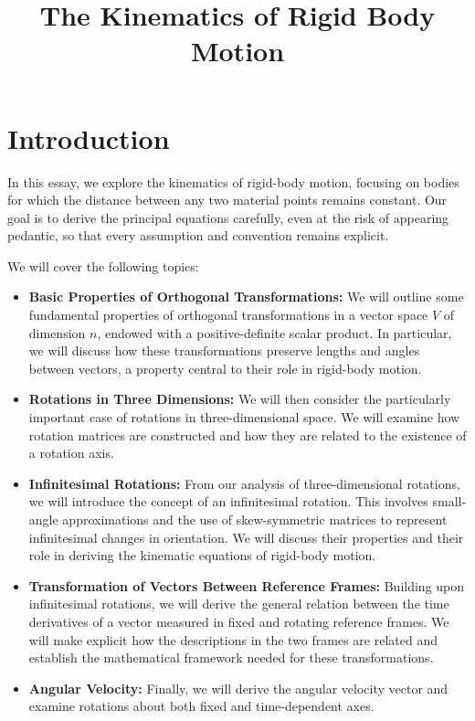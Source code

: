 \documentclass[12pt]{article}
\title{The Kinematics of Rigid Body Motion}
\author{}
\date{}
\begin{document}
\maketitle


\section{Introduction}

In this essay, we explore the kinematics of rigid-body motion, focusing on bodies for which
the distance between any two material points remains constant. Our goal is to derive the
principal equations carefully, even at the risk of appearing pedantic, so that every
assumption and convention remains explicit.\par

We will cover the following topics:

\begin{itemize}
\item \textbf{Basic Properties of Orthogonal Transformations:} We will outline some
fundamental properties of orthogonal transformations in a vector space $V$ of
dimension $n$, endowed with a positive-definite scalar product. In particular, we
will discuss how these transformations preserve lengths and angles between vectors,
a property central to their role in rigid-body motion.

\item \textbf{Rotations in Three Dimensions:} We will then consider the particularly
important case of rotations in three-dimensional space. We will examine how rotation
matrices are constructed and how they are related to the existence of a rotation
axis.

\item \textbf{Infinitesimal Rotations:} From our analysis of three-dimensional rotations,
we will introduce the concept of an infinitesimal rotation. This involves
small-angle approximations and the use of skew-symmetric matrices to represent
infinitesimal changes in orientation. We will discuss their properties and their role
in deriving the kinematic equations of rigid-body motion.

\item \textbf{Transformation of Vectors Between Reference Frames:} Building upon
infinitesimal rotations, we will derive the general relation between the time
derivatives of a vector measured in fixed and rotating reference frames. We will
make explicit how the descriptions in the two frames are related and establish the
mathematical framework needed for these transformations.

\item \textbf{Angular Velocity:} Finally, we will derive the angular velocity vector and
examine rotations about both fixed and time-dependent axes.
\end{itemize}
\end{document}
